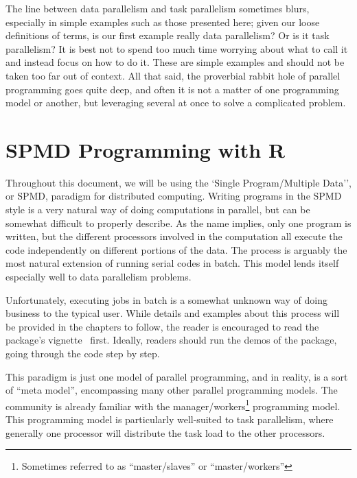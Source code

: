 The line between data parallelism and task parallelism sometimes blurs,
especially in simple examples such as those presented here; given our loose
definitions of terms, is our first example really data parallelism?  Or is
it task parallelism?  It is best not to spend too much time worrying about
what to call it and instead focus on how to do it. These are simple examples
and should not be taken too far out of context. All that said, the proverbial
rabbit hole of parallel programming goes quite deep, and often it is not a
matter of one programming model or another, but leveraging several at once
to solve a complicated problem.





\section{SPMD Programming with R}

Throughout this document, we will be using the `Single Program/Multiple Data'',
or SPMD, paradigm for distributed computing.
Writing programs in the SPMD style is a very natural way of doing
computations in parallel, but can be somewhat difficult to properly describe.
As the name implies, only one program is written, but the different processors
involved in the computation all execute the code independently on different
portions of the data. The process is arguably the most natural extension of
running serial codes in batch. This model lends itself especially well to
data parallelism problems.

Unfortunately, executing jobs in batch is a somewhat unknown way of doing
business to the typical  user. While details and examples about
this process will be provided in the chapters to follow, the reader is
encouraged to read the  package's
vignette~\citep{Chen2012pbdMPIvignette} first.  Ideally, readers should
run the demos of the  package, going through the code step by step.

This paradigm is just one model of parallel programming, and in reality, is a sort of ``meta model'', encompassing many other parallel programming models.  The  community is already familiar with the manager/workers\footnote{Sometimes referred to as ``master/slaves'' or ``master/workers''} programming model.  This programming model is particularly well-suited to task parallelism, where generally one processor will distribute the task load to the other processors.

